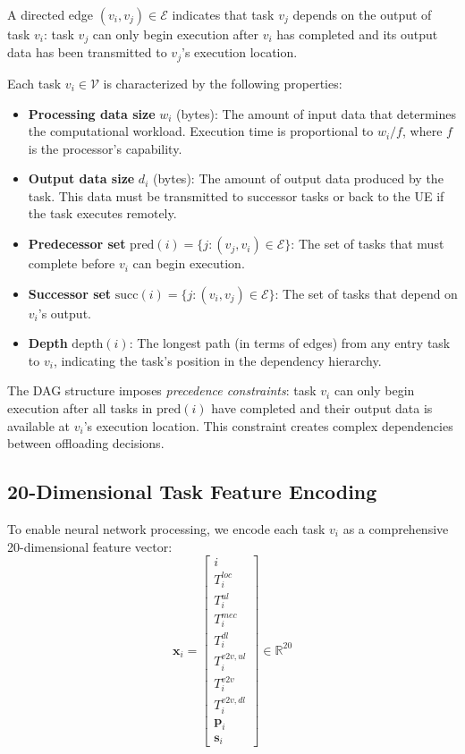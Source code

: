 \documentclass[journal,twoside]{IEEEtran}
\newcommand{\R}{\mathbb{R}}
\begin{document}
A directed edge $(v_i, v_j) \in \mathcal{E}$ indicates that task $v_j$ depends on the output of task $v_i$: task $v_j$ can only begin execution after $v_i$ has completed and its output data has been transmitted to $v_j$'s execution location.

Each task $v_i \in \mathcal{V}$ is characterized by the following properties:
\begin{itemize}
    \item \textbf{Processing data size} $w_i$ (bytes): The amount of input data that determines the computational workload. Execution time is proportional to $w_i / f$, where $f$ is the processor's capability.
    
    \item \textbf{Output data size} $d_i$ (bytes): The amount of output data produced by the task. This data must be transmitted to successor tasks or back to the UE if the task executes remotely.
    
    \item \textbf{Predecessor set} $\text{pred}(i) = \{j : (v_j, v_i) \in \mathcal{E}\}$: The set of tasks that must complete before $v_i$ can begin execution.
    
    \item \textbf{Successor set} $\text{succ}(i) = \{j : (v_i, v_j) \in \mathcal{E}\}$: The set of tasks that depend on $v_i$'s output.
    
    \item \textbf{Depth} $\text{depth}(i)$: The longest path (in terms of edges) from any entry task to $v_i$, indicating the task's position in the dependency hierarchy.
\end{itemize}

The DAG structure imposes \textit{precedence constraints}: task $v_i$ can only begin execution after all tasks in $\text{pred}(i)$ have completed and their output data is available at $v_i$'s execution location. This constraint creates complex dependencies between offloading decisions.

\subsection{20-Dimensional Task Feature Encoding}

To enable neural network processing, we encode each task $v_i$ as a comprehensive 20-dimensional feature vector:
    \begin{equation}
\mathbf{x}_i = \begin{bmatrix} i \\ T_i^{loc} \\ T_i^{ul} \\ T_i^{mec} \\ T_i^{dl} \\ T_i^{v2v,ul} \\ T_i^{v2v} \\ T_i^{v2v,dl} \\ \mathbf{p}_i \\ \mathbf{s}_i \end{bmatrix} \in \R^{20}
\label{eq:task_features}
    \end{equation}
\end{document}
